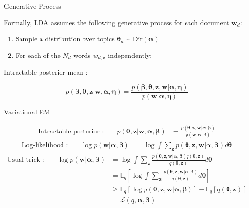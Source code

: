 \documentclass{beamer}
\begin{document}
\begin{frame}{Generative Process}

Formally, LDA assumes the following generative process for each document $\mathbf{w}_d$:
\vspace{0.5cm}
{\large
\begin{enumerate}
\item Sample a distribution over topics $\bm{\theta}_d \sim \mathrm{Dir}(\bm{\alpha})$
\item For each of the $N_d$ words $w_{d,n}$ independently:
\end{enumerate}
}
\vspace{0.5cm}

Intractable posterior mean :

{\Large
$$
p(\bm{\beta}, \bm{\theta}, \mathbf{z}| \mathbf{w}, \bm{\alpha}, \bm{\eta}) = \frac{p(\bm{\beta}, \bm{\theta}, \mathbf{z}, \mathbf{w}| \bm{\alpha}, \bm{\eta})}{p(\mathbf{w}| \bm{\alpha}, \bm{\eta})}
$$
}

\end{frame}

%
%

\begin{frame}{Variational EM}

\begin{align*}
\text{Intractable posterior : } && p(\bm{\theta}, \mathbf{z}| \mathbf{w}, \bm{\alpha}, \bm{\beta}) & = \frac{p(\bm{\theta}, \mathbf{z}, \mathbf{w}| \bm{\alpha}, \bm{\beta})}{p(\mathbf{w}| \bm{\alpha}, \bm{\beta})}
\end{align*}
\begin{align*}
\text{Log-likelihood : } && \log p(\mathbf{w}|\bm{\alpha,\beta}) & = \log \int \sum_{\mathbf{z}}p(\bm{\theta}, \mathbf{z}, \mathbf{w}| \bm{\alpha}, \bm{\beta}) d\bm{\theta}
\end{align*}
\begin{align*}
\text{Usual trick : } && \log p(\mathbf{w}|\bm{\alpha,\beta}) & = \log \int \sum_{\mathbf{z}} \frac{p(\bm{\theta}, \mathbf{z}, \mathbf{w}| \bm{\alpha}, \bm{\beta})q(\bm{\theta},\mathbf{z})}{q(\bm{\theta},\mathbf{z})} d\bm{\theta} \\
 && & = \mathbb{E}_q \left[ \log \int \sum_{\mathbf{z}} \frac{p(\bm{\theta}, \mathbf{z}, \mathbf{w}| \bm{\alpha}, \bm{\beta})}{q(\bm{\theta},\mathbf{z})} d\bm{\theta} \right]\\
 && & \ge \mathbb{E}_q \left[ \log p(\bm{\theta}, \mathbf{z}, \mathbf{w}| \bm{\alpha}, \bm{\beta})\right] - \mathbb{E}_q \left[q(\bm{\theta},\mathbf{z}) \right] \\
 && & = \mathcal{L}(q,\bm{\alpha}, \bm{\beta})
\end{align*}

\end{frame}
\end{document}
